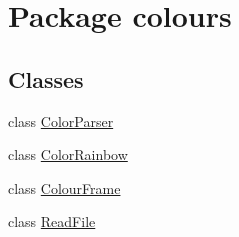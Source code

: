 \hypertarget{namespacecolours}{}\section{Package colours}
\label{namespacecolours}
\subsection*{Classes}
\begin{DoxyCompactItemize}
\item 
class \hyperlink{classcolours_1_1_color_parser}{Color\+Parser}
\item 
class \hyperlink{classcolours_1_1_color_rainbow}{Color\+Rainbow}
\item 
class \hyperlink{classcolours_1_1_colour_frame}{Colour\+Frame}
\item 
class \hyperlink{classcolours_1_1_read_file}{Read\+File}
\end{DoxyCompactItemize}
